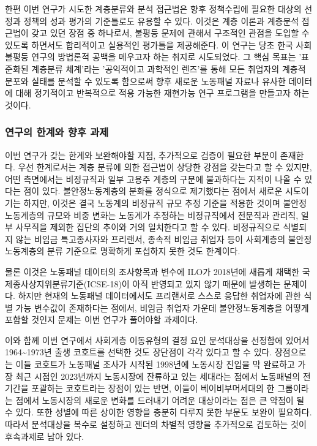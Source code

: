 \documentclass[
  letterpaper,
  DIV=11,
  numbers=noendperiod]{scrartcl}
\begin{document}
한편 이번 연구가 시도한 계층분류와 분석 접근법은 향후 정책수립에 필요한
대상의 선정과 정책의 성과 평가의 기준틀로도 유용할 수 있다. 이것은 계층
이론과 계층분석 접근법이 갖고 있던 장점 중 하나로서, 불평등 문제에
관해서 구조적인 관점을 도입할 수 있도록 하면서도 합리적이고 실용적인
평가틀을 제공해준다. 이 연구는 당초 한국 사회 불평등 연구의 방법론적
공백을 메우고자 하는 취지로 시도되었다. 그 핵심 목표는 '표준화된
계층분류 체계'라는 '공익적이고 과학적인 렌즈'를 통해 모든 취업자의
계층적 분포와 실태를 분석할 수 있도록 함으로써 향후 새로운 노동패널
자료나 유사한 데이터에 대해 정기적이고 반복적으로 적용 가능한 재현가능
연구 프로그램을 만들고자 하는 것이다.

\subsubsection{연구의 한계와 향후
과제}\label{uxc5f0uxad6cuxc758-uxd55cuxacc4uxc640-uxd5a5uxd6c4-uxacfcuxc81c}

이번 연구가 갖는 한계와 보완해야할 지점, 추가적으로 검증이 필요한 부분이
존재한다. 우선 한계로서는 계층 분류에 의한 접근법이 상당한 강점을
갖는다고 할 수 있지만, 어떤 측면에서는 비정규직과 일부 고용주 계층의
구분에 불과하다는 지적이 나올 수 있다는 점이 있다. 불안정노동계층의
분화를 정식으로 제기했다는 점에서 새로운 시도이기는 하지만, 이것은 결국
노동계의 비정규직 규모 추정 기준을 적용한 것이며 불안정노동계층의 규모와
비중 변화는 노동계가 추정하는 비정규직에서 전문직과 관리직, 일부
사무직을 제외한 집단의 추이와 거의 일치한다고 할 수 있다. 비정규직으로
식별되지 않는 비임금 특고종사자와 프리랜서, 종속적 비임금 취업자 등이
사회계층의 불안정노동계층의 분류 기준으로 명확하게 포섭하지 못한 것도
한계이다.

물론 이것은 노동패널 데이터의 조사항목과 변수에 ILO가 2018년에 새롭게
채택한 국제종사상지위분류기준(ICSE-18)이 아직 반영되고 있지 않기 때문에
발생하는 문제이다. 하지만 현재의 노동패널 데이터에서도 프리랜서로 스스로
응답한 취업자에 관한 식별 가능 변수값이 존재하다는 점에서, 비임금 취업자
가운데 불안정노동계층을 어떻게 포함할 것인지 문제는 이번 연구가 풀어야할
과제이다.

이와 함께 이번 연구에서 사회계층 이동유형의 결정 요인 분석대상을
선정함에 있어서 1964\textasciitilde1973년 출생 코호트를 선택한 것도
장단점이 각각 있다고 할 수 있다. 장점으로는 이들 코호트가 노동패널
조사가 시작된 1998년에 노동시장 진입을 막 완료하고 가장 최근 시점인
2023년까지 노동시장에 잔류하고 있는 세대라는 점에서 노동패널의 전 기간을
포괄하는 코호트라는 장점이 있는 반면, 이들이 베이비부머세대의 한
그룹이라는 점에서 노동시장의 새로운 변화를 드러내기 어려운 대상이라는
점은 큰 약점이 될 수 있다. 또한 성별에 따른 상이한 영향을 충분히 다루지
못한 부문도 보완이 필요하다. 따라서 분석대상을 복수로 설정하고 젠더의
차별적 영향을 추가적으로 검토하는 것이 후속과제로 남아 있다.
\end{document}
